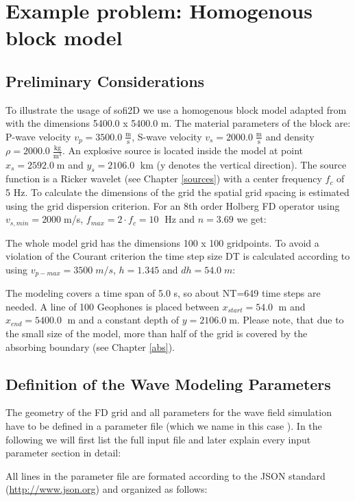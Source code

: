 \documentclass[11pt,onecolumn,oneside]{article}
\begin{document}
\section{Example problem: Homogenous block model}
\label{simple test}
\subsection{Preliminary Considerations}
To illustrate the usage of sofi2D we use a homogenous block model adapted from \cite{kang:04} with the dimensions 5400.0 x 5400.0 m. The material parameters of the block are:  P-wave velocity $v_p=3500.0\; \frac{\mathrm{m}}{\mathrm{s}}$, S-wave velocity $v_s=2000.0\; \frac{\mathrm{m}}{\mathrm{s}}$ and density $\rho=2000.0\; \frac{\mathrm{kg}}{\mathrm{m}^3}$. An explosive source is located inside the model at point  $x_s=2592.0\;$m and $y_s=2106.0\;$ km (y denotes the vertical direction). The source function is a Ricker wavelet (see Chapter \ref{sources}) with a center frequency $f_c$ of 5 Hz. To calculate the dimensions of the grid the spatial grid spacing is estimated using the grid dispersion criterion. For an 8th order Holberg FD operator using $v_{s,min}=2000\;$m/s, $f_{max}=2 \cdot f_c=10\;$ Hz and $n=3.69$ we get:


The whole model grid has the dimensions 100 x 100 gridpoints. To avoid a violation of the Courant criterion the time step size DT is calculated according to using $v_{p-max}=3500\; m/s$, $h=1.345$ and $dh=54.0\; m$:


The modeling covers a time span of 5.0 s, so about NT=649 time steps are needed. A line of 100 Geophones is placed between $x_{start}=54.0\;$ m and $x_{end}=5400.0\;$ m and a constant depth of $y=2106.0\;$m. Please note, that due to the small size of the model, more than half of the grid is covered by the absorbing boundary (see Chapter \ref{abs}). 

\subsection{Definition of the Wave Modeling Parameters}
\label{modelgeom}
The geometry of the FD grid and all parameters for the wave field simulation have to be defined in a parameter file (which we name in this case {}). In the following we will first list the full input file and later explain every input parameter section in detail:

All lines in the parameter file are formated according to the JSON standard (\url{http://www.json.org}) and organized as follows: 
\end{document}
